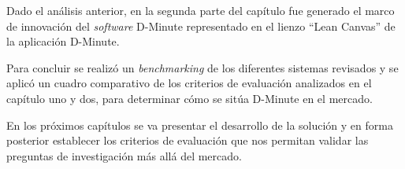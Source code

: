 Dado el análisis anterior, en la segunda parte del capítulo fue generado el marco de innovación del \textit{software} D-Minute representado en el lienzo “Lean Canvas” de la aplicación D-Minute.

Para concluir se realizó un \textit{benchmarking} de los diferentes sistemas revisados y se aplicó un cuadro comparativo de los criterios de evaluación analizados en el capítulo uno y dos, para determinar cómo se sitúa D-Minute en el mercado.

En los próximos capítulos se va presentar el desarrollo de la solución y en forma posterior establecer los criterios de evaluación que nos permitan validar las preguntas de investigación más allá del mercado.

